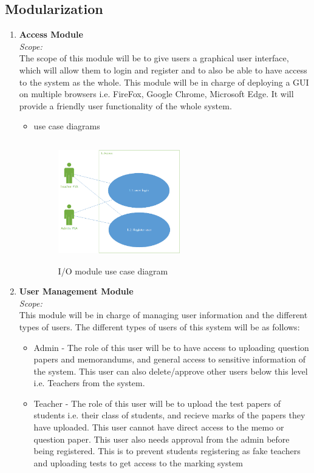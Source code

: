 \documentclass{article}
\begin{document}
	\subsection{Modularization}
		\begin{enumerate}
			\item \textbf{Access Module} \\
							\textit{Scope:}\\
							 The scope of this module will be to give users a graphical user interface, which will allow them to login and register and to also be able to have access to the system as the whole. This module will be in charge of deploying a GUI on multiple browsers i.e. FireFox, Google Chrome, Microsoft Edge. It will provide a friendly user functionality of the whole system.  
\begin{itemize}
						\item use case diagrams\\
								\begin{figure}[h]
								\includegraphics[width=200px, height=200px]{access.png}
								\caption{I/O module use case diagram}
								\end{figure}
\end{itemize}
			\item \textbf{User Management Module}\\
						\textit{Scope:}\\
						This module will be in charge of managing user information and the different types of users. The different types of users of this system will be as follows: \\
						\begin{itemize}
							\item Admin - The role of this user will be to have access to uploading question papers and memorandums, and general access to sensitive information of the system. This user can also delete/approve other users below this level i.e. Teachers from the system. 
							\item Teacher - The role of this user will be to upload the test papers of students i.e. their class of students, and recieve marks of the papers they have uploaded. This user cannot have direct access to the memo or question paper. This user also needs approval from the admin before being registered. This is to prevent students registering as fake teachers and uploading tests to get access to the marking system 

\end{itemize}
\end{enumerate}
\end{document}
